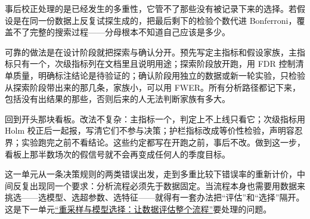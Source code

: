事后校正处理的是已经发生的多重性，它管不了那些没有被记录下来的选择。若假设是在同一份数据上反复试探生成的，把最后剩下的检验个数代进 Bonferroni，覆盖不了完整的搜索过程——分母根本不知道自己应该是多少。

可靠的做法是在设计阶段就把探索与确认分开。预先写定主指标和假设家族，主指标只有一个，次级指标列在文档里且说明用途；探索阶段放开跑，用 FDR 控制清单质量，明确标注结论是待验证的；确认阶段用独立的数据或新一轮实验，只检验从探索阶段带出来的那几条，家族小，可以用 FWER。所有分析路径都记下来，包括没有出结果的那些，否则后来的人无法判断家族有多大。

回到开头那块看板。改法不复杂：主指标一个，判定上不上线只看它；次级指标用 Holm 校正后一起报，写清它们不参与决策；护栏指标改成等价性检验，声明容忍界；实验跑完之前不看结论。这些约定都写在开跑之前，事后不改。做到这一步，看板上那半数场次的假信号就不会再变成任何人的季度目标。

这一单元从一条决策规则的两类错误出发，走到多重比较下错误率的重新计价，中间反复出现同一个要求：分析流程必须先于数据固定。当流程本身也需要用数据来挑选——选模型、选超参数、选特征——就得有一套办法把``评估''和``选择''隔开。这是下一单元\hyperref[ch:091]{``重采样与模型选择：让数据评估整个流程''}要处理的问题。
